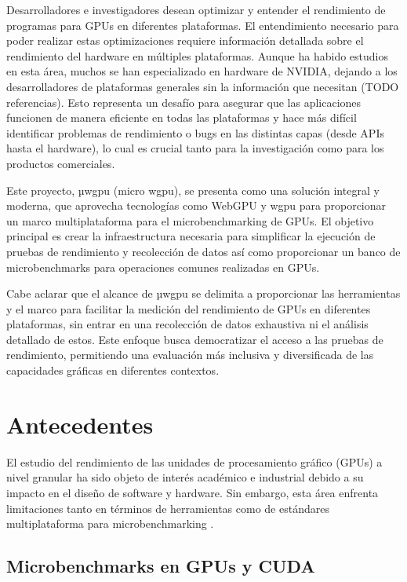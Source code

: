 \documentclass[conference]{IEEEtran}
\begin{document}
Desarrolladores e investigadores desean optimizar y entender el rendimiento de programas para GPUs en diferentes plataformas.
El entendimiento necesario para poder realizar estas optimizaciones requiere
información detallada sobre el rendimiento del hardware en múltiples
plataformas. Aunque ha habido estudios en esta área, muchos se han
especializado en hardware de NVIDIA, dejando a los desarrolladores de
plataformas generales sin la información que necesitan (TODO referencias).
Esto representa un desafío para asegurar que las aplicaciones funcionen de
manera eficiente en todas las plataformas y hace más difícil identificar
problemas de rendimiento o bugs en las distintas capas (desde APIs hasta el
hardware), lo cual es crucial tanto para la investigación como para los
productos comerciales.

Este proyecto, µwgpu (micro wgpu), se presenta como una solución integral y
moderna, que aprovecha tecnologías como WebGPU y wgpu para proporcionar un
marco multiplataforma para el microbenchmarking de GPUs.
El objetivo principal es crear la infraestructura necesaria para simplificar la
ejecución de pruebas de rendimiento y recolección de datos así como
proporcionar un banco de microbenchmarks para operaciones comunes realizadas en
GPUs.

Cabe aclarar que el alcance de µwgpu se delimita a proporcionar las
herramientas y el marco para facilitar la medición del rendimiento de GPUs en
diferentes plataformas, sin entrar en una recolección de datos exhaustiva ni el
análisis detallado de estos.
Este enfoque busca democratizar el acceso a las pruebas de rendimiento,
permitiendo una evaluación más inclusiva y diversificada de las capacidades
gráficas en diferentes contextos.

\section{Antecedentes}

El estudio del rendimiento de las unidades de procesamiento gráfico (GPUs) a
nivel granular ha sido objeto de interés académico e industrial debido a su
impacto en el diseño de software y hardware. Sin embargo, esta área enfrenta
limitaciones tanto en términos de herramientas como de estándares
multiplataforma para microbenchmarking \cite{muniyappamicro}.

\subsection{Microbenchmarks en GPUs y CUDA}
\end{document}
